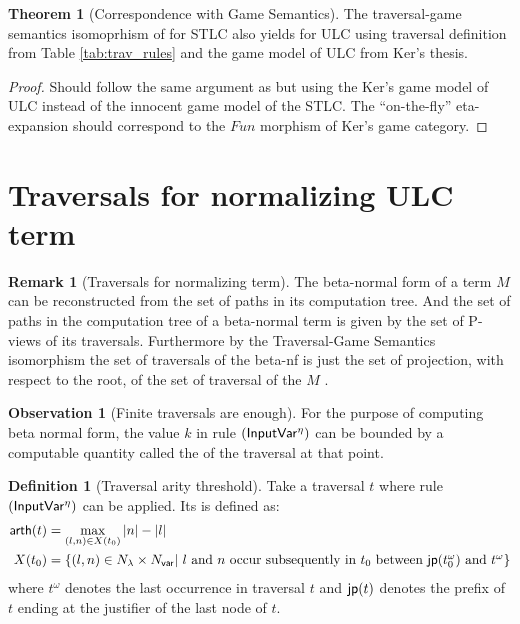 \documentclass{article}
\theoremstyle{definition}
\newtheorem{definition}{Definition}[section]
\newtheorem{remark}{Remark}[section]
\newtheorem{theorem}{Theorem}[section]
\newtheorem{observation}{Observation}[section]
\newcommand\Nodes{N}%
\begin{document}
\begin{theorem}[Correspondence with Game Semantics]
\label{thm:ulc_corresp}
The traversal-game semantics isomoprhism of \cite{BlumPhd} for STLC also yields for ULC using traversal definition from Table \ref{tab:trav_rules} and the game model of ULC from Ker's thesis.
\end{theorem}
\begin{proof}
Should follow the same argument as \cite{BlumPhd} but using the Ker's game model of ULC instead of the innocent game model of the STLC.
The ``on-the-fly'' eta-expansion should correspond to the $Fun$ morphism of Ker's game category.
\end{proof}

\section{Traversals for normalizing ULC term}

\begin{remark}[Traversals for normalizing term]
The beta-normal form of a term $M$ can be reconstructed from the set of paths in its computation tree. And the set of paths in the computation tree of a beta-normal term is given by the set of P-views of its traversals. Furthermore by the Traversal-Game Semantics isomorphism the set of traversals of the beta-nf is just the set of projection, with respect to the root, of the set of traversal of the $M$ \cite{BlumPhd}.
\end{remark}

\begin{observation}[Finite traversals are enough]
For the purpose of computing beta normal form, the value $k$ in rule $\mathbf{({\sf InputVar^\eta})}$ can be bounded by a computable quantity called the  of the traversal at that point.
\end{observation}

\begin{definition}[Traversal arity threshold]
\label{dfn:arity-threshold}
Take a traversal $t$ where rule $\mathbf{({\sf InputVar^\eta})}$ can be applied. Its  is defined as:
    \begin{align*}
    \textsf{arth}(t) &= \max_{(l,n)\in X(t_0)} |n| - |l| \\
    X(t_0) &= \{ (l,n) \in \Nodes_\lambda \times \Nodes_{\sf var} | \mbox{ $l$ and $n$ occur subsequently in $t_0$ between $\jp(t_0^\omega)$ and $t^\omega$} \}
    \end{align*}
where $t^\omega$ denotes the last occurrence in traversal $t$ and ${\sf jp}(t)$ denotes the prefix of $t$ ending at the justifier of the last node of $t$.
\end{definition}
\end{document}
